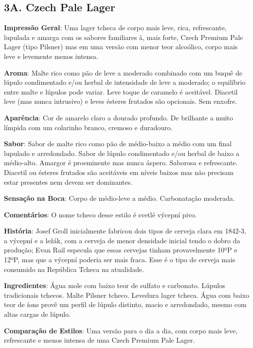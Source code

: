 \subsection*{3A. Czech Pale Lager}
\textbf{Impressão Geral}: Uma lager tcheca de corpo mais leve, rica, refrescante, lupulada e amarga com os sabores familiares à, mais forte, Czech Premium Pale Lager (tipo Pilsner) mas em uma versão com menor teor alcoólico, corpo mais leve e levemente menos intensa.

\textbf{Aroma}: Malte rico como pão de leve a moderado combinado com um buquê de lúpulo condimentado e/ou herbal de intensidade de leve a moderado; o equilíbrio entre malte e lúpulos pode variar. Leve toque de caramelo é aceitável. Diacetil leve (mas nunca intrusivo) e leves ésteres frutados são opcionais. Sem enxofre.

\textbf{Aparência}: Cor de amarelo claro a dourado profundo. De brilhante a muito límpida com um colarinho branco, cremoso e duradouro.

\textbf{Sabor}: Sabor de malte rico como pão de médio-baixo a médio com um final lupulado e arredondado. Sabor de lúpulo condimentado e/ou herbal de baixo a médio-alto. Amargor é proeminente mas nunca áspero. Saborosa e refrescante. Diacetil ou ésteres frutados são aceitáveis em níveis baixos mas não precisam estar presentes nem devem ser dominantes.

\textbf{Sensação na Boca}: Corpo de médio-leve a médio. Carbonatação moderada.

\textbf{Comentários}: O nome tcheco desse estilo é svetlé výcepní pivo.

\textbf{História}: Josef Groll inicialmente fabricou dois tipos de cerveja clara em 1842-3, a výcepní e a ležák, com a cerveja de menor densidade inicial tendo o dobro da produção; Evan Rail especula que essas cervejas tinham provavelmente 10ºP e 12ºP, mas que a výcepní poderia ser mais fraca. Esse é o tipo de cerveja mais consumido na República Tcheca na atualidade.

\textbf{Ingredientes}: Água mole com baixo teor de sulfato e carbonato. Lúpulos tradicionais tchecos. Malte Pilsner tcheco. Levedura lager tcheca. Água com baixo teor de íons provê um perfil de lúpulo distinto, macio e arredondado, mesmo com altas cargas de lúpulo.

\textbf{Comparação de Estilos}: Uma versão para o dia a dia, com corpo mais leve, refrescante e menos intensa de uma Czech Premium Pale Lager.

